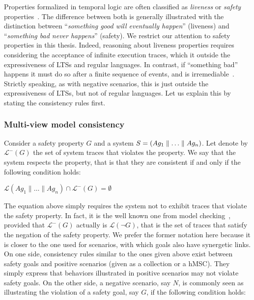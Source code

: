 Properties formalized in temporal logic are often classified as \emph{liveness} or \emph{safety} properties~\cite{Alpern:1986}. The difference between both is generally illustrated with the distinction between ``\emph{something good will eventually happen}'' (liveness) and  ``\emph{something bad never happens}'' (safety). We restrict our attention to safety properties in this thesis. Indeed, reasoning about liveness properties requires considering the acceptance of infinite execution traces, which it outside the expressiveness of LTSs and regular languages. In contrast, if ``something bad'' happens it must do so after a finite sequence of events, and is irremediable~\cite{Alpern:1986, Giannakopoulou:1999}. Strictly speaking, as with negative scenarios, this is just outside the expressiveness of LTSs, but not of regular languages. Let us explain this by stating the consistency rules first.

\subsubsection*{Multi-view model consistency}

Consider a safety property $G$ and a system $S = (Ag_1 \parallel \ldots \parallel Ag_n)$. Let denote by $\mathcal{L}^{-}(G)$ the set of system traces that violates the property. We say that the system respects the property, that is that they are consistent if and only if the following condition holds:

\begin{center}
$\mathcal{L}(Ag_1 \parallel \ldots \parallel Ag_n) \cap \mathcal{L}^{-}(G) = \emptyset$
\end{center}

The equation above simply requires the system not to exhibit traces that violate the safety property. In fact, it is the well known one from model checking~\cite{Clarke:1989}, provided that $\mathcal{L}^{-}(G)$ actually is $\mathcal{L}(\neg G)$, that is the set of traces that satisfy the negation of the safety property. We prefer the former notation here because it is closer to the one used for scenarios, with which goals also have synergetic links. On one side, consistency rules similar to the ones given above exist between safety goals and positive scenarios (given as a collection or a hMSC). They simply express that behaviors illustrated in positive scenarios may not violate safety goals. On the other side, a negative scenario, say $N$, is commonly seen as illustrating the violation of a safety goal, say $G$, if the following condition holds:

